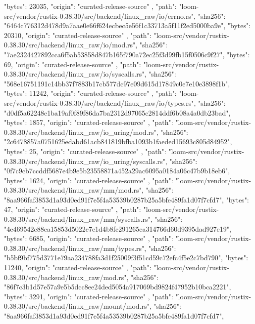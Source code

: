 {{      "bytes": 23035,
      "origin": "curated-release-source"
    },
    {
      "path": "loom-src/vendor/rustix-0.38.30/src/backend/linux_raw/io/errno.rs",
      "sha256": "6464c776312d478d9a7aae0e66f624ecbec5e56f1c33713a5f11f2ed5000ba9e",
      "bytes": 20310,
      "origin": "curated-release-source"
    },
    {
      "path": "loom-src/vendor/rustix-0.38.30/src/backend/linux_raw/io/mod.rs",
      "sha256": "7ae2324427892cca6f5ab53858d847b165f790a72ec25f3d99fb15f0506c9f27",
      "bytes": 69,
      "origin": "curated-release-source"
    },
    {
      "path": "loom-src/vendor/rustix-0.38.30/src/backend/linux_raw/io/syscalls.rs",
      "sha256": "568e16751191c14bb37f7883b17cb577dc97e09d615d17849c0e7e10e3898f1b",
      "bytes": 11242,
      "origin": "curated-release-source"
    },
    {
      "path": "loom-src/vendor/rustix-0.38.30/src/backend/linux_raw/io/types.rs",
      "sha256": "d0df5a62248e1ba19af0f89f86da7ba2312d97065c2814ddf6b08a4a0db23bad",
      "bytes": 1857,
      "origin": "curated-release-source"
    },
    {
      "path": "loom-src/vendor/rustix-0.38.30/src/backend/linux_raw/io_uring/mod.rs",
      "sha256": "2c6478857a0751625edabd61acb841819bfba1093b1faeded15693c805d84952",
      "bytes": 25,
      "origin": "curated-release-source"
    },
    {
      "path": "loom-src/vendor/rustix-0.38.30/src/backend/linux_raw/io_uring/syscalls.rs",
      "sha256": "0f7c9cb7ccddf5687e4b9e5b23558871a452a29ac6095a0184a06c47b9b18eb6",
      "bytes": 1624,
      "origin": "curated-release-source"
    },
    {
      "path": "loom-src/vendor/rustix-0.38.30/src/backend/linux_raw/mm/mod.rs",
      "sha256": "8aa966faf3853d1a93d0ed91f7e5f4a53539b0287b25a5bfe489fa1d07f7cfd7",
      "bytes": 47,
      "origin": "curated-release-source"
    },
    {
      "path": "loom-src/vendor/rustix-0.38.30/src/backend/linux_raw/mm/syscalls.rs",
      "sha256": "4e469542c88ea15853d5022e7e1d4b8fc291265ca314766d60d9395dad927e19",
      "bytes": 6685,
      "origin": "curated-release-source"
    },
    {
      "path": "loom-src/vendor/rustix-0.38.30/src/backend/linux_raw/mm/types.rs",
      "sha256": "b5bf9bf775d3771e79aa234788fa3d1f25009f3f51cd59c72efc4f5e2c7bd790",
      "bytes": 11240,
      "origin": "curated-release-source"
    },
    {
      "path": "loom-src/vendor/rustix-0.38.30/src/backend/linux_raw/mod.rs",
      "sha256": "86f7c3b1d57e57a9e5b5dcc8ee24ded5054a917069bd9824f47952b10bca2221",
      "bytes": 3291,
      "origin": "curated-release-source"
    },
    {
      "path": "loom-src/vendor/rustix-0.38.30/src/backend/linux_raw/mount/mod.rs",
      "sha256": "8aa966faf3853d1a93d0ed91f7e5f4a53539b0287b25a5bfe489fa1d07f7cfd7",
}}
